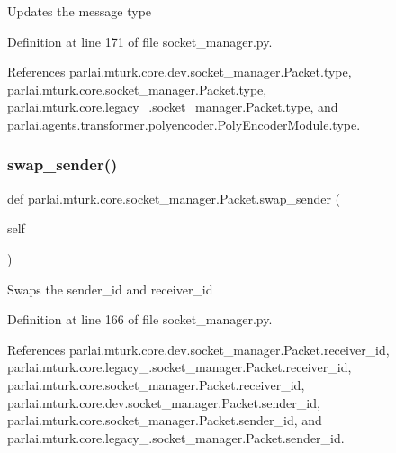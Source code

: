 \begin{DoxyVerb}Updates the message type\end{DoxyVerb}
 

Definition at line 171 of file socket\+\_\+manager.\+py.



References parlai.\+mturk.\+core.\+dev.\+socket\+\_\+manager.\+Packet.\+type, parlai.\+mturk.\+core.\+socket\+\_\+manager.\+Packet.\+type, parlai.\+mturk.\+core.\+legacy\+\_.\+socket\+\_\+manager.\+Packet.\+type, and parlai.\+agents.\+transformer.\+polyencoder.\+Poly\+Encoder\+Module.\+type.

\mbox{\label{classparlai_1_1mturk_1_1core_1_1socket__manager_1_1Packet_a369524e6a2a2628fe23d5277fb90a600}} 
\subsubsection{\texorpdfstring{swap\+\_\+sender()}{swap\_sender()}}
{\footnotesize\ttfamily def parlai.\+mturk.\+core.\+socket\+\_\+manager.\+Packet.\+swap\+\_\+sender (\begin{DoxyParamCaption}\item[{}]{self }\end{DoxyParamCaption})}

\begin{DoxyVerb}Swaps the sender_id and receiver_id\end{DoxyVerb}
 

Definition at line 166 of file socket\+\_\+manager.\+py.



References parlai.\+mturk.\+core.\+dev.\+socket\+\_\+manager.\+Packet.\+receiver\+\_\+id, parlai.\+mturk.\+core.\+legacy\+\_.\+socket\+\_\+manager.\+Packet.\+receiver\+\_\+id, parlai.\+mturk.\+core.\+socket\+\_\+manager.\+Packet.\+receiver\+\_\+id, parlai.\+mturk.\+core.\+dev.\+socket\+\_\+manager.\+Packet.\+sender\+\_\+id, parlai.\+mturk.\+core.\+socket\+\_\+manager.\+Packet.\+sender\+\_\+id, and parlai.\+mturk.\+core.\+legacy\+\_.\+socket\+\_\+manager.\+Packet.\+sender\+\_\+id.



